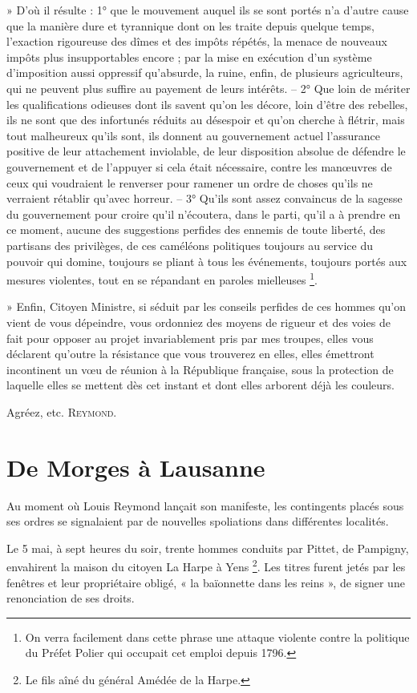 \documentclass[french,twoside]{book} %
\newenvironment{quoteblock}%
  {\begin{quoting}}
  {\end{quoting}}
\newenvironment{quotebar}{%
    \def\FrameCommand{{\color{rubric!10!}\vrule width 0.5em} \hspace{0.9em}}%
    \def\OuterFrameSep{\itemsep} %
    \MakeFramed {\advance\hsize-\width \FrameRestore}
  }%
  {%
    \endMakeFramed
  }
\renewenvironment{quoteblock}%
  {%
    \savenotes
    \setstretch{0.9}
    \begin{quotebar}
  }
  {%
    \end{quotebar}
    \spewnotes
  }
\begin{document}
\begin{quoteblock}
 » D’où il résulte : 1° que le mouvement auquel ils se sont portés n’a d’autre cause que la manière dure et tyrannique dont on les traite depuis quelque temps, l’exaction rigoureuse des dîmes et des impôts répétés, la menace de nouveaux impôts plus insupportables encore ; par la mise en exécution d’un système d’imposition aussi oppressif qu’absurde, la ruine, enfin, de plusieurs agriculteurs, qui ne peuvent plus suffire au payement de leurs intérêts. – 2° Que loin de mériter les qualifications odieuses dont ils savent qu’on les décore, loin d’être des rebelles, ils ne sont que des infortunés réduits au désespoir et qu’on cherche à flétrir, mais tout malheureux qu’ils sont, ils donnent au gouvernement actuel l’assurance positive de leur attachement inviolable, de leur disposition absolue de défendre le gouvernement et de l’appuyer si cela était nécessaire, contre les manœuvres de ceux qui voudraient le renverser pour ramener un ordre de choses qu’ils ne verraient rétablir qu’avec horreur. – 3° Qu’ils sont assez convaincus de la sagesse du gouvernement pour croire qu’il n’écoutera, dans le parti, qu’il a à prendre en ce moment, aucune des suggestions perfides des ennemis de toute liberté, des partisans des privilèges, de ces caméléons politiques toujours au service du pouvoir qui domine, toujours se pliant à tous les événements, toujours portés aux mesures violentes, tout en se répandant en paroles mielleuses \footnote{On verra facilement dans cette phrase une attaque violente contre la politique du Préfet Polier qui occupait cet emploi depuis 1796.}.\par
 » Enfin, Citoyen Ministre, si séduit par les conseils perfides de ces hommes qu’on vient de vous dépeindre, vous ordonniez des moyens de rigueur et des voies de fait pour opposer au projet invariablement pris par mes troupes, elles vous déclarent qu’outre la résistance que vous trouverez en elles, elles émettront incontinent un vœu de réunion à la République française, sous la protection de laquelle elles se mettent dès cet instant et dont elles arborent déjà les couleurs.\par
 Agréez, etc. {\scshape Reymond.}
 \end{quoteblock}

\section[De Morges à Lausanne]{De Morges à Lausanne}
\noindent Au moment où Louis Reymond lançait son manifeste, les contingents placés sous ses ordres se signalaient par de nouvelles spoliations dans différentes localités.\par
Le 5 mai, à sept heures du soir, trente hommes conduits par Pittet, de Pampigny, envahirent la maison du citoyen La Harpe à Yens \footnote{Le fils aîné du général Amédée de la Harpe.}. Les titres furent jetés par les fenêtres et leur propriétaire obligé, « la baïonnette dans les reins », de signer une renonciation de ses droits.\par
\end{document}
